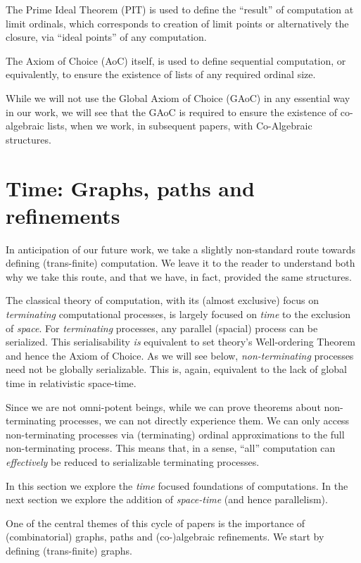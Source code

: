 \documentclass[a4paper]{amsart}
\begin{document}
The Prime Ideal Theorem (PIT) is used to define the ``result'' of computation at
limit ordinals, which corresponds to creation of limit points or alternatively
the closure, via ``ideal points'' of any computation.

The Axiom of Choice (AoC) itself, is used to define sequential computation, or
equivalently, to ensure the existence of lists of any required ordinal size.

While we will not use the Global Axiom of Choice (GAoC) in any essential way in
our work, we will see that the GAoC is required to ensure the existence of
co-algebraic lists, when we work, in subsequent papers, with Co-Algebraic
structures.

\section{Time: Graphs, paths and refinements}

In anticipation of our future work, we take a slightly non-standard route towards defining
(trans-finite) computation. We leave it to the reader to understand both why we take
this route, and that we have, in fact, provided the same structures.

The classical theory of computation, with its (almost exclusive) focus on
\emph{terminating} computational processes, is largely focused on \emph{time} to the
exclusion of \emph{space}. For \emph{terminating} processes, any parallel (spacial)
process can be serialized. This serialisability \emph{is} equivalent to set theory's
Well-ordering Theorem and hence the Axiom of Choice. As we will see below,
\emph{non-terminating} processes need not be globally serializable. This is, again,
equivalent to the lack of global time in relativistic space-time.

Since we are not omni-potent beings, while we can prove theorems about non-terminating 
processes, we can not directly experience them. We can only access non-terminating processes 
via (terminating) ordinal approximations to the full non-terminating process. This means 
that, in a sense, ``all'' computation can \emph{effectively} be reduced to serializable 
terminating processes. 

In this section we explore the \emph{time} focused foundations of computations. In the next 
section we explore the addition of \emph{space-time} (and hence parallelism).

One of the central themes of this cycle of papers is the importance of (combinatorial)
graphs, paths and (co-)algebraic refinements. We start by defining (trans-finite) graphs.
\end{document}

